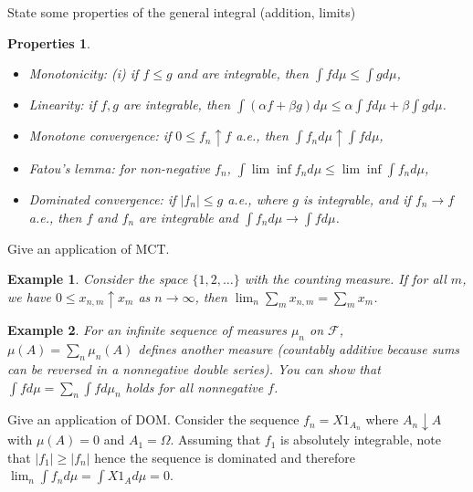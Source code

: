 \documentclass[avery5388,grid,frame]{flashcards}
\newcommand{\F}{\mathcal F}
\newtheorem*{example}{Example}
\newtheorem*{properties}{Properties}
\begin{document}
\begin{flashcard}
    {State some properties of the general integral (addition, limits)}
    \begin{properties}
        \begin{itemize}
            \item Monotonicity: (i) if $f \leq g$ and are integrable, then $\int f d\mu \leq \int g d\mu$,
            \item Linearity: if $f,g$ are integrable, then $\int (\alpha f + \beta g) d\mu \leq \alpha \int f d\mu + \beta \int g d\mu$.
            \item Monotone convergence: if $0 \leq f_n \uparrow f$ a.e., then $\int f_n d\mu \uparrow \int f d\mu$,
            \item Fatou's lemma: for non-negative $f_n$, $\int \lim \inf f_n d\mu \leq \lim \inf \int f_n d\mu$,
            \item Dominated convergence: if $|f_n| \leq g$ a.e., where $g$ is integrable, and if $f_n \rightarrow f$ a.e., then $f$ and $f_n$ are integrable and $\int f_n d\mu \rightarrow \int f d\mu$.
        \end{itemize}
    \end{properties}
\end{flashcard}


\begin{flashcard}
    {Give an application of MCT.}
    \begin{example}
        Consider the space $\{ 1, 2, \dots \}$ with the counting measure. If for all $m$, we have $0 \leq x_{n,m} \uparrow x_m$ as $n \rightarrow \infty$, then $\lim_n \sum_m x_{n,m} = \sum_m x_m$.
    \end{example}
    \begin{example}
        For an infinite sequence of measures $\mu_n$ on $\F$, $\mu(A) = \sum_n \mu_n(A)$ defines another measure (countably additive because sums can be reversed in a nonnegative double series). You can show that $\int f d\mu = \sum_n \int f d\mu_n$ holds for all nonnegative $f$.
    \end{example}
\end{flashcard}


\begin{flashcard}
    {Give an application of DOM.}
    Consider the sequence $f_n = X 1_{A_n} $ where $A_n \downarrow A$ with $\mu(A) = 0$ and $A_1 = \Omega$. Assuming that $f_1$ is absolutely integrable, note that $|f_1| \geq |f_n|$ hence the sequence is dominated and therefore $\lim_n \int f_n d\mu = \int X 1_{A} d\mu = 0$.
\end{flashcard}
\end{document}
